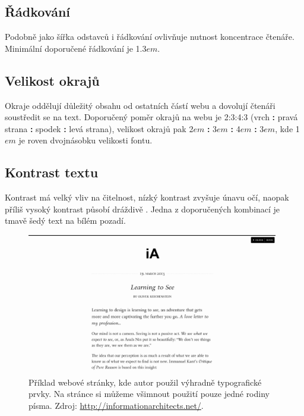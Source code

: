 \subsection{Řádkování}

Podobně jako šířka odstavců i řádkování ovlivňuje nutnost koncentrace čtenáře. Minimální doporučené řádkování je 1.3$em$.

\subsection{Velikost okrajů}

Okraje oddělují důležitý obsahu od ostatních částí webu a dovolují čtenáři soustředit se na text. Doporučený poměr okrajů na webu je 2:3:4:3 (vrch \textbf{:} pravá strana \textbf{:} spodek \textbf{:} levá strana), velikost okrajů pak 2$em$ \textbf{:} 3$em$ \textbf{:} 4$em$ \textbf{:} 3$em$, kde 1$em$ je roven dvojnásobku velikosti fontu.

\subsection{Kontrast textu}

Kontrast má velký vliv na čitelnost, nízký kontrast zvyšuje únavu očí, naopak příliš vysoký kontrast působí dráždivě \cite{eye-strain}. Jedna z doporučených kombinací je tmavě šedý text na bílém pozadí.

\begin{figure}[htbp]
    \centering
    \includegraphics[width=11cm]{images/typography.png}
    \caption{Příklad webové stránky, kde autor použil výhradně typografické prvky. Na stránce si můžeme všimnout použití pouze jedné rodiny písma. Zdroj: \url{http://informationarchitects.net/}.}
    \label{fig:web-typography}
\end{figure}

